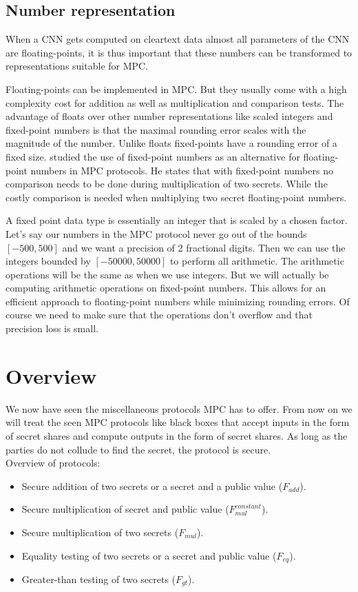 \subsection{Number representation}
When a CNN gets computed on cleartext data almost all parameters of the CNN are floating-points, it is thus important that these numbers can be transformed to representations suitable for MPC.

Floating-points can be implemented in MPC. But they usually come with a high complexity cost for addition as well as multiplication and comparison tests. The advantage of floats over other number representations like scaled integers and fixed-point numbers is that the maximal rounding error scales with the magnitude of the number. Unlike floats fixed-points have a rounding error of a fixed size. \cite{campmans2018optimizing} studied the use of fixed-point numbers as an alternative for floating-point numbers in MPC protocols. He states that with fixed-point numbers no comparison needs to be done during multiplication of two secrets. While the costly comparison is needed when multiplying two secret floating-point numbers.

A fixed point data type is essentially an integer that is scaled by a chosen factor. Let's say our numbers in the MPC protocol never go out of the bounds $[-500,500]$ and we want a precision of 2 fractional digits. Then we can use the integers bounded by $[-50000,50000]$ to perform all arithmetic. The arithmetic operations will be the same as when we use integers. But we will actually be computing arithmetic operations on fixed-point numbers. This allows for an efficient approach to floating-point numbers while minimizing rounding errors. Of course we need to make sure that the operations don't overflow and that precision loss is small.

\section{Overview}
We now have seen the miscellaneous protocols MPC has to offer. From now on we will treat the seen MPC protocols like black boxes that accept inputs in the form of secret shares and compute outputs in the form of secret shares. As long as the parties do not collude to find the secret, the protocol is secure.\\
Overview of protocols:
\begin{itemize}
  \item Secure addition of two secrets or a secret and a public value ($F_{add}$).
  \item Secure multiplication of secret and public value ($F_{mul}^{constant}$).
  \item Secure multiplication of two secrets ($F_{mul}$).
  \item Equality testing of two secrets or a secret and public value ($F_{eq}$).
  \item Greater-than testing of two secrets ($F_{gt}$).
\end{itemize}

